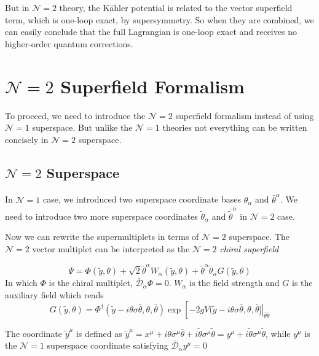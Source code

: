 \documentclass{article}
\begin{document}
But in $\mathcal{N}=2$ theory, the K\"{a}hler potential is related to the vector superfield term, which is one-loop exact, by supersymmetry. So when they are combined, we can easily conclude that the full Lagrangian is one-loop exact and receives no higher-order quantum corrections.

\section{$\mathcal{N}=2$ Superfield Formalism}
To proceed, we need to introduce the $\mathcal{N}=2$ superfield formalism instead of using $\mathcal{N}=1$ superspace. But unlike the $\mathcal{N}=1$ theories not everything can be written concisely in $\mathcal{N}=2$ superspace.

\subsection{$\mathcal{N}=2$ Superspace}
In $\mathcal{N}=1$ case, we introduced two superspace coordinate bases $\theta_\alpha$ and $\bar{\theta}^{\dot{\alpha}}$. We need to introduce two more superspace coordinates $\tilde{\theta}_\alpha$ and $\bar{\tilde{\theta}}^{\dot{\alpha}}$ in $\mathcal{N}=2$ case.

Now we can rewrite the supermultiplets in terms of $\mathcal{N}=2$ superspace. The $\mathcal{N}=2$ vector multiplet can be interpreted as the $\mathcal{N}=2$ \textit{chiral superfield}

\begin{equation}
\label{eq:chiral}
\Psi=\Phi(\tilde{y}, \theta)+\sqrt{2} \tilde{\theta}^{\alpha} W_{\alpha}(\tilde{y}, \theta)+\tilde{\theta}^{\alpha} \tilde{\theta}_{\alpha}G(\tilde{y}, \theta)
\end{equation}
In which $\Phi$ is the chiral multiplet, $\bar{\mathcal{D}}_{\dot{\alpha}}\Phi=0$. $W_\alpha$ is the field strength and $G$ is the auxiliary field which reads
\begin{equation}
G(\tilde{y}, \theta)=\Phi^{\dagger}(\tilde{y}-i \theta \sigma \bar{\theta}, \theta, \bar{\theta}) \exp \left[\left.-2 g V(\tilde{y}-i \theta \sigma \bar{\theta}, \theta, \bar{\theta}]\right|_{\bar{\theta} \bar{\theta}}\right.
\end{equation}

The coordinate $\tilde{y}^\mu$ is defined as $\tilde{y}^\mu=x^{\mu}+i \theta \sigma^{\mu} \bar{\theta}+i \tilde{\theta} \sigma^{\mu} \tilde{\theta}=y^\mu+i \tilde{\theta} \sigma^{\mu} \tilde{\theta}$, while $y^\mu$ is the $\mathcal{N}=1$ superspace coordinate satisfying $\bar{\mathcal{D}}_{\dot{\alpha}}y^\mu=0$
\end{document}

